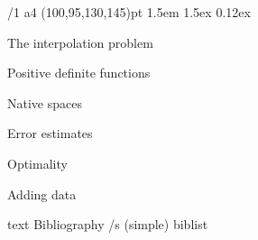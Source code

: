 \useOpTeX  %

\load[thesismac]

\hyperlinks \Black \Black
{}

\enlang
\fontfam[EBGaramond]

\def\QED{\Umathchar"0"01"00203B}

\margins/1 a4 (100,95,130,145)pt
\typosize[12.21/14.5]
\parindent 1.5em
\parskip 1.5ex
 0.12ex




\sec The interpolation problem


\sec Positive definite functions


\sec Native spaces


\sec Error estimates


\sec Optimality


\sec Adding data









\let\_mtext\ignoreit
\nonum\chap Bibliography
\def\_opwarning#1{}
\usebib/s (simple) biblist


\bye